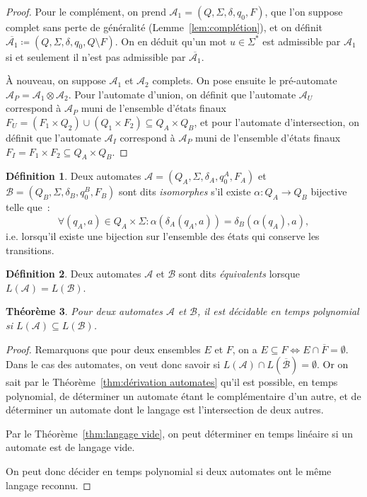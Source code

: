 \documentclass{article}
\newtheorem{thm}{Théorème}[section]
\theoremstyle{definition}
\newtheorem{déf}[thm]{Définition}
\theoremstyle{remark}
\newcommand{\automaton}{(Q, \Sigma, \delta, q_0, F)}
\begin{document}
	\begin{proof} Pour le complément, on prend $\mathcal A_1 = \automaton$, que l'on suppose complet sans perte de généralité (Lemme~\ref{lem:complétion}), et
	on définit $\overline {\mathcal A_1} \coloneqq (Q, \Sigma, \delta, q_0, Q \setminus F)$. On en déduit qu'un mot $u \in \Sigma^*$ est admissible par $\mathcal A_1$
	si et seulement il n'est pas admissible par $\overline {\mathcal A_1}$.

	À nouveau, on suppose $\mathcal A_1$ et $\mathcal A_2$ complets. On pose ensuite le pré-automate $\mathcal A_P = \mathcal A_1 \otimes \mathcal A_2$. Pour
	l'automate d'union, on définit que l'automate $\mathcal A_U$ correspond à $\mathcal A_P$ muni de l'ensemble d'états finaux
	$F_U = (F_1 \times Q_2) \cup (Q_1 \times F_2) \subseteq Q_A \times Q_B$, et pour l'automate d'intersection, on définit que l'automate $\mathcal A_I$
	correspond à $\mathcal A_P$ muni de l'ensemble d'états finaux $F_I = F_1 \times F_2 \subseteq Q_A \times Q_B$.
	\end{proof}

	\begin{déf} Deux automates $\mathcal A = (Q_A, \Sigma, \delta_A, q_0^A, F_A)$ et $\mathcal B = (Q_B, \Sigma, \delta_B, q_0^B, F_B)$ sont dits \textit{isomorphes}
	s'il existe $\alpha : Q_A \to Q_B$ bijective telle que~:
	\[\forall (q_A, a) \in Q_A \times \Sigma : \alpha(\delta_A(q_A, a)) = \delta_B(\alpha(q_A), a),\]
	i.e. lorsqu'il existe une bijection sur l'ensemble des états qui conserve les transitions.
	\end{déf}

	\begin{déf} Deux automates $\mathcal A$ et $\mathcal B$ sont dits \textit{équivalents} lorsque $L(\mathcal A) = L(\mathcal B)$.
	\end{déf}

	\begin{thm} Pour deux automates $\mathcal A$ et $\mathcal B$, il est décidable en temps polynomial si $L(\mathcal A) \subseteq L(\mathcal B)$.
	\end{thm}

	\begin{proof} Remarquons que pour deux ensembles $E$ et $F$, on a $E \subseteq F \iff E \cap \overline F = \emptyset$. Dans le cas des automates, on veut
	donc savoir si $L(\mathcal A) \cap L(\overline {\mathcal B}) = \emptyset$. Or on sait par le Théorème~\ref{thm:dérivation automates} qu'il est possible, en
	temps polynomial, de déterminer un automate étant le complémentaire d'un autre, et de déterminer un automate dont le langage est l'intersection de deux autres.

	Par le Théorème~\ref{thm:langage vide}, on peut déterminer en temps linéaire si un automate est de langage vide.

	On peut donc décider en temps polynomial si deux automates ont le même langage reconnu.
	\end{proof}
\end{document}
